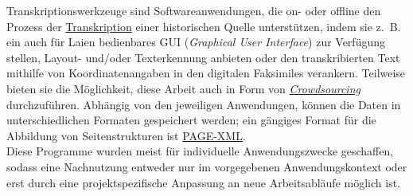 \documentclass{article}
\begin{document}
    Transkriptionswerkzeuge sind Softwareanwendungen, die on- oder offline den Prozess der \href{http://gams.uni-graz.at/o:konde.197}{Transkription} einer historischen Quelle unterstützen, indem sie z. B. ein auch für Laien bedienbares GUI (\emph{Graphical User Interface}) zur Verfügung stellen, Layout- und/oder Texterkennung anbieten oder den transkribierten Text mithilfe von Koordinatenangaben in den digitalen Faksimiles verankern. Teilweise bieten sie die Möglichkeit, diese Arbeit auch in Form von \emph{\href{http://gams.uni-graz.at/o:konde.47}{Crowdsourcing}} durchzuführen. Abhängig von den jeweiligen Anwendungen, können die Daten in unterschiedlichen Formaten gespeichert werden; ein gängiges Format für die Abbildung von Seitenstrukturen ist \href{http://gams.uni-graz.at/o:konde.154}{PAGE-XML}. \\
            
        Diese Programme wurden meist für individuelle Anwendungszwecke geschaffen, sodass eine Nachnutzung entweder nur im vorgegebenen Anwendungskontext oder erst durch eine projektspezifische Anpassung an neue Arbeitsabläufe möglich ist.\\
            
\end{document}
